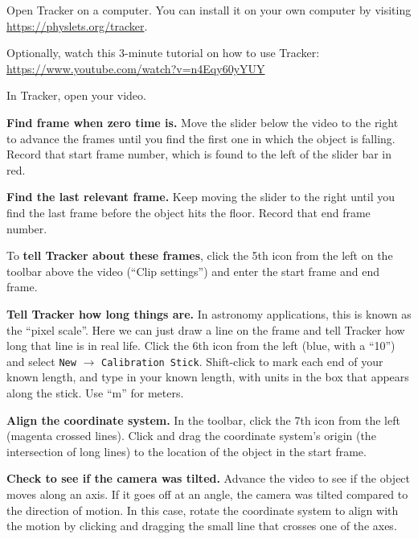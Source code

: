 \begin{steps}
	\item Open Tracker on a computer. You can install it on your own computer by visiting \url{https://physlets.org/tracker}.
	
	\item Optionally, watch this 3-minute tutorial on how to use Tracker: \url{https://www.youtube.com/watch?v=n4Eqy60yYUY}
	
	\item In Tracker, open your video.
	
	\item \textbf{Find frame when zero time is.} Move the slider below the video to the right to advance the frames until you find the first one in which the object is falling. Record that start frame number, which is found to the left of the slider bar in red.
	
	\item \textbf{Find the last relevant frame.} Keep moving the slider to the right until you find the last frame before the object hits the floor. Record that end frame number.
	
	\item To \textbf{tell Tracker about these frames}, click the 5th icon from the left on the toolbar above the video (``Clip settings'') and enter the start frame and end frame.
	
	\item \textbf{Tell Tracker how long things are.} In astronomy applications, this is known as the ``pixel scale''. Here we can just draw a line on the frame and tell Tracker how long that line is in real life. Click the 6th icon from the left (blue, with a ``10'') and select \texttt{New} $\rightarrow$ \texttt{Calibration Stick}. Shift-click to mark each end of your known length, and type in your known length, with units in the box that appears along the stick. Use ``m'' for meters.
	
	\item \textbf{Align the coordinate system.} In the toolbar, click the 7th icon from the left (magenta crossed lines). Click and drag the coordinate system's origin (the intersection of long lines) to the location of the object in the start frame.
	
	\item \textbf{Check to see if the camera was tilted.} Advance the video to see if the object moves along an axis. If it goes off at an angle, the camera was tilted compared to the direction of motion. In this case, rotate the coordinate system to align with the motion by clicking and dragging the small line that crosses one of the axes.
	

\end{steps}
